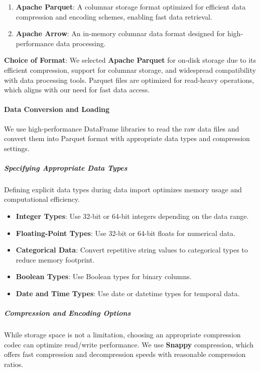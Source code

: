\documentclass[12pt, a4paper]{article}
\begin{document}
\begin{enumerate}
    \item \textbf{Apache Parquet}: A columnar storage format optimized for efficient data compression and encoding schemes, enabling fast data retrieval.
    \item \textbf{Apache Arrow}: An in-memory columnar data format designed for high-performance data processing.
\end{enumerate}

\textbf{Choice of Format}: We selected \textbf{Apache Parquet} for on-disk storage due to its efficient compression, support for columnar storage, and widespread compatibility with data processing tools. Parquet files are optimized for read-heavy operations, which aligns with our need for fast data access.

\paragraph{Data Conversion and Loading}

We use high-performance DataFrame libraries to read the raw data files and convert them into Parquet format with appropriate data types and compression settings.

\subparagraph{Specifying Appropriate Data Types}

Defining explicit data types during data import optimizes memory usage and computational efficiency.

\begin{itemize}
    \item \textbf{Integer Types}: Use 32-bit or 64-bit integers depending on the data range.
    \item \textbf{Floating-Point Types}: Use 32-bit or 64-bit floats for numerical data.
    \item \textbf{Categorical Data}: Convert repetitive string values to categorical types to reduce memory footprint.
    \item \textbf{Boolean Types}: Use Boolean types for binary columns.
    \item \textbf{Date and Time Types}: Use date or datetime types for temporal data.
\end{itemize}

\subparagraph{Compression and Encoding Options}

While storage space is not a limitation, choosing an appropriate compression codec can optimize read/write performance. We use \textbf{Snappy} compression, which offers fast compression and decompression speeds with reasonable compression ratios.
\end{document}
